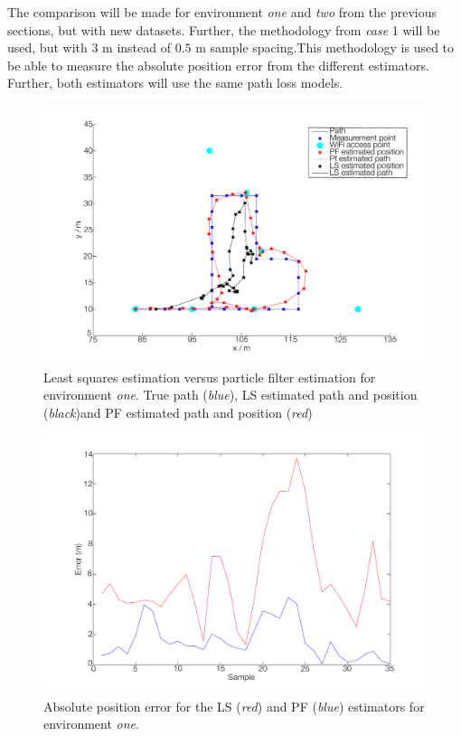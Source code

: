 \documentclass{LTHthesis}
\begin{document}
The comparison will be made for environment \emph{one} and \emph{two} from the previous sections, but with new datasets. Further, the methodology from \emph{case }1 will be used, but with 3 m instead of $0.5$ m sample spacing.This methodology is used to be able to measure the absolute position error from the different estimators. Further, both estimators will use the same path loss models.   
%
\begin{figure}[!hbt]

\includegraphics[width=1\textwidth ]{images/pure_rssi/ls_short_path}
\caption{Least squares estimation versus particle filter estimation for environment \emph{one}. True path (\emph{blue}), LS estimated path and position (\emph{black})and PF estimated path and position (\emph{red})}\label{ls_short}
\end{figure}
%
\begin{figure}[!hbt]

\includegraphics[width=1\textwidth ]{images/pure_rssi/ls_error_short}
\caption{Absolute position error for the LS (\emph{red}) and PF (\emph{blue}) estimators for environment \emph{one}.}\label{ls_error_short}
\end{figure}
\end{document}
